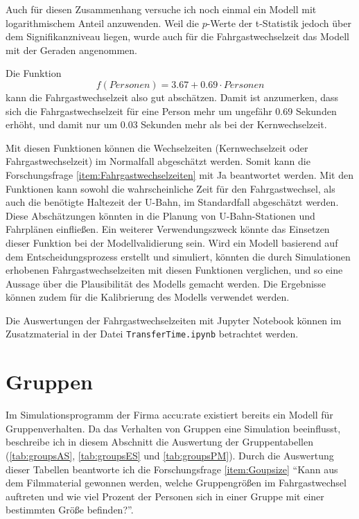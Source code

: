 Auch für diesen Zusammenhang versuche ich noch einmal ein Modell mit logarithmischem Anteil anzuwenden. Weil die $p$-Werte der t-Statistik jedoch über dem Signifikanzniveau liegen, wurde auch für die Fahrgastwechselzeit das Modell mit der Geraden angenommen.

Die Funktion 
\begin{equation}
f(Personen) = 3.67 + 0.69 \cdot Personen 
\end{equation}  
kann die Fahrgastwechselzeit also gut abschätzen. Damit ist anzumerken, dass sich die Fahrgastwechselzeit für eine Person mehr um ungefähr 0.69 Sekunden erhöht, und damit nur um 0.03 Sekunden mehr als bei der Kernwechselzeit.

Mit diesen Funktionen können die Wechselzeiten (Kernwechselzeit oder Fahrgastwechselzeit) im Normalfall abgeschätzt werden. Somit kann die Forschungsfrage \ref{item:Fahrgastwechselzeiten} mit Ja beantwortet werden. Mit den Funktionen kann sowohl die wahrscheinliche Zeit für den Fahrgastwechsel, als auch die benötigte Haltezeit der U-Bahn, im Standardfall abgeschätzt werden. Diese Abschätzungen könnten in die Planung von U-Bahn-Stationen und Fahrplänen einfließen. Ein weiterer Verwendungszweck könnte das Einsetzen dieser Funktion bei der Modellvalidierung sein. Wird ein Modell basierend auf dem Entscheidungsprozess erstellt und simuliert, könnten die durch Simulationen erhobenen Fahrgastwechselzeiten mit diesen Funktionen verglichen, und so eine Aussage über die Plausibilität des Modells gemacht werden. Die Ergebnisse können zudem für die Kalibrierung des Modells verwendet werden. 

Die Auswertungen der Fahrgastwechselzeiten mit \textsf{Jupyter Notebook} können im Zusatzmaterial in der Datei \texttt{TransferTime.ipynb} betrachtet werden.
\section{Gruppen} \label{Gruppen}
Im Simulationsprogramm der Firma accu:rate existiert bereits ein Modell für Gruppenverhalten. Da das Verhalten von Gruppen eine Simulation beeinflusst, beschreibe ich in diesem Abschnitt die Auswertung der Gruppentabellen (\tablename \ref{tab:groupsAS}, \tablename \ref{tab:groupsES} und \tablename \ref{tab:groupsPM}). Durch die Auswertung dieser Tabellen beantworte ich die Forschungsfrage \ref{item:Goupsize} "`Kann aus dem Filmmaterial gewonnen werden, welche Gruppengrößen im Fahrgastwechsel auftreten und wie viel Prozent der Personen sich in einer Gruppe mit einer bestimmten Größe befinden?"'.

